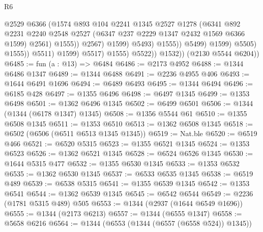 \begin{lexlean}{R6}
\begin{coremodule}
                                            @2529
                                            @6366
                                            (@1574
                                              @893
                                              @104
                                              @2241
                                              @1345
                                              @2527
                                              @1278
                                              (@6341
                                                @892
                                                @2231
                                                @2240
                                                @2548
                                                @2527
                                                (@6347 @237 @2229 @1347 @2432 @1569 @6366 @1599)
                                                @2561)
                                              @1555))
                                          @2567)
                                        @1599)
                                      @5493)
                                    @1555))
                                @5499)
                              @1599)
                            @5505)
                          @1555))
                      @5511)
                    @1599)
                  @5517)
                @1555)
              @5522))
          @1532))
      (@2130 @5544 @6204))
@6485 := fun (a : @13) => @6484
@6486 := @2173 @4952
@6488 := @1344 @6486 @1347
@6489 := @1344 @6488
@6491 := @2236 @4955 @406
@6493 := @1644 @6491 @1696
@6494 := @6489 @6493
@6495 := @1344 @6494
@6496 := @6185 @428
@6497 := @1355 @6496
@6498 := @6497 @1345
@6499 := @1353 @6498
@6501 := @1362 @6496 @1345
@6502 := @6499 @6501
@6506 := @1344 (@1344 (@6178 @1347) @1345)
@6508 := @1356 @5544 @61
@6510 := @1355 @6508 @1345
@6511 := @1353 @6510
@6513 := @1362 @6508 @1345
@6518 := @6502 (@6506 (@6511 @6513 @1345 @1345))
@6519 := Nat.ble
@6520 := @6519 @466
@6521 := @6520 @5315
@6523 := @1355 @6521 @1345
@6524 := @1353 @6523
@6526 := @1362 @6521 @1345
@6528 := @6524 @6526 @1345
@6530 := @1644 @5315 @477
@6532 := @1355 @6530 @1345
@6533 := @1353 @6532
@6535 := @1362 @6530 @1345
@6537 := @6533 @6535 @1345
@6538 := @6519 @489
@6539 := @6538 @5315
@6541 := @1355 @6539 @1345
@6542 := @1353 @6541
@6544 := @1362 @6539 @1345
@6545 := @6542 @6544
@6549 := @2236 (@1781 @5315 @489) @505
@6553 := @1344 (@2937 (@1644 @6549 @1696))
@6555 := @1344 (@2173 @6213)
@6557 := @1344 (@6555 @1347)
@6558 := @5658 @6216
@6564 := @1344 (@6553 (@1344 (@6557 (@6558 @524)) @1345))

\end{coremodule}
\end{lexlean}
